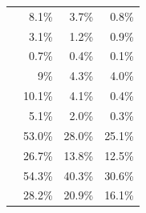 \begin{table}[!htbp]
\begin{tabular}{lrrr}
\eeTo{ \Pquark \Pquark} &  8.1\% &3.7\% & 0.8\%\\
\eeTo{ \Pquark \Pquark \Plepton \Pnu} & 3.1\% & 1.2\% & 0.9\%\\
\eeTo{ \Pquark \Pquark \Pl \Pl} &  0.7\% &0.4\% & 0.1\%\\
\eeTo{ \Pquark \Pquark \Pnu \Pnu} & 9\% & 4.3\% & 4.0\%\\
\hline
\egamma{\Pepm}{\Pphoton}{\BS}{\Pepm \Pquark \Pquark \Pquark \Pquark} & 10.1\% & 4.1\%  & 0.4\%\\
\egamma{\Pepm}{\Pphoton}{\EPA}{\Pepm \Pquark \Pquark \Pquark \Pquark} & 5.1\% & 2.0\% & 0.3\%\\
\egamma{\Pepm}{\Pphoton}{\BS}{\Pnu \Pquark \Pquark \Pquark \Pquark}& 53.0\%  & 28.0\% & 25.1\%\\
\egamma{\Pem}{\Pphoton}{\EPA}{\Pnu \Pquark \Pquark \Pquark \Pquark}& 26.7\% & 13.8\% & 12.5\% \\
\egamma{\Pepm}{\Pphoton}{\BS}{\Pquark \Pquark \PHiggs \Pnu} & 54.3\% & 40.3\%  & 30.6\% \\
\egamma{\Pem}{\Pphoton}{\EPA}{\Pquark \Pquark \PHiggs \Pnu} & 28.2\% & 20.9\% & 16.1\%  \\

\end{tabular}
\end{table}
